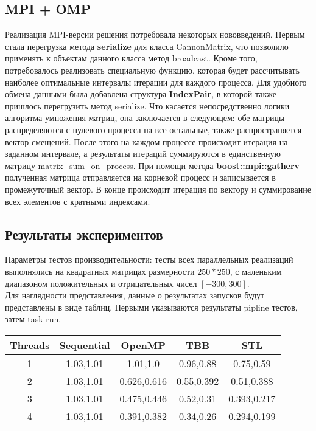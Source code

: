 \documentclass[12pt]{article}
\begin{document}
\subsection{MPI + OMP}
Реализация MPI-версии решения потребовала некоторых нововведений. Первым стала перегрузка метода \textbf{serialize} для класса CannonMatrix, что позволило применять к объектам данного класса метод broadcast. Кроме того, потребовалось реализовать специальную функцию, которая будет рассчитывать наиболее оптимальные интервалы итерации для каждого процесса. Для удобного обмена данными была добавлена структура \textbf{IndexPair}, в которой также пришлось перегрузить метод serialize. Что касается непосредственно логики алгоритма умножения матриц, она заключается в следующем: обе матрицы распределяются с нулевого процесса на все остальные, также распространяется вектор смещений. После этого на каждом процессе происходит итерация на заданном интервале, а результаты итераций суммируются в единственную матрицу matrix\_sum\_on\_process. При помощи метода \textbf{boost::mpi::gatherv} полученная матрица отправляется на корневой процесс и записывается в промежуточный вектор. В конце происходит итерация по вектору и суммирование всех элементов с кратными индексами. 
\newpage
\newpage
\begin{center}
    \section{Результаты экспериментов}
\end{center}

Параметры тестов производительности: тесты всех параллельных реализаций выполнялись на квадратных матрицах размерности $250*250$, с маленьким диапазоном положительных и отрицательных чисел $[-300, 300]$. \\

Для наглядности представления, данные о результатах запусков будут представлены в виде таблиц. Первыми указываются результаты pipline тестов, затем task run.
\\
\begin{center}
    \begin{tabular}{|c|c|c|c|c|}
    \cline{1-5}
     Threads & Sequential & OpenMP & TBB & STL\\  \hline
      1 & 1.03,1.01 & 1.01,1.0 & 0.96,0.88 & 0.75,0.59 \\ \hline
      2 & 1.03,1.01 & 0.626,0.616 & 0.55,0.392 & 0.51,0.388\\ \hline
      3 & 1.03,1.01 & 0.475,0.446 & 0.52,0.31 & 0.393,0.217 \\ \hline
      4 & 1.03,1.01 & 0.391,0.382 & 0.34,0.26 & 0.294,0.199\\ \hline
    \cline{1-5}
    \end{tabular}
\end{center} 
\end{document}
